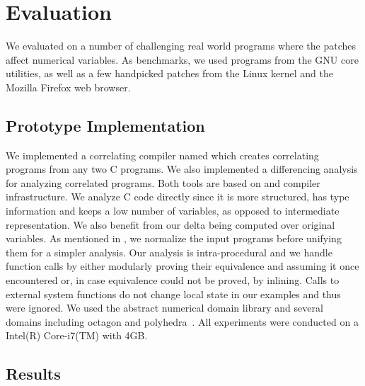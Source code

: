 \section{Evaluation}
We evaluated {\tool} on a number of challenging real world programs where the patches affect numerical variables. As benchmarks, we used programs from the GNU core utilities, as well as a few handpicked patches from the Linux kernel and the Mozilla Firefox web browser.

\subsection{Prototype Implementation}
We implemented a correlating compiler named  which creates correlating programs from any two C programs. We also implemented a differencing analysis for analyzing correlated programs. Both tools are based on  and  compiler infrastructure. We analyze C code directly since it is more structured, has type information and keeps a low number of variables, as opposed to intermediate representation. We also benefit from our delta being computed over original variables. As mentioned in , we normalize the input programs before unifying them for a simpler analysis. Our analysis is intra-procedural and we handle function calls by either modularly proving their equivalence and assuming it once encountered or, in case equivalence could not be proved, by inlining. Calls to external system functions do not change local state in our examples and thus were ignored. We used the  abstract numerical domain library and several domains including octagon \cite{Mine2006} and polyhedra~\cite{CousotHalbwachs78}. All experiments were conducted on a Intel(R) Core-i7(TM) with 4GB.

\subsection{Results}




